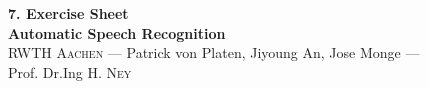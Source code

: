 \documentclass[12pt,oneside,a4paper]{article}
\begin{document}
\begin{center}
{\LARGE \bfseries 
 7. Exercise Sheet  \\[0.1cm] 
}
{ \large \bfseries
 Automatic Speech Recognition \\[0.3cm] %
}
{\large
  \textsc{RWTH Aachen} --- Patrick von Platen, Jiyoung An, Jose Monge ---\\[0.3cm]
}
{\normalsize
  Prof. Dr.Ing H. \textsc{Ney} \\[0.92cm] %
}
\end{center}
  
 \newpage
 

\end{document}
